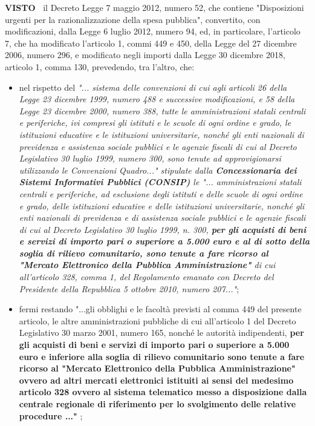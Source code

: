 \textbf{VISTO~}	il Decreto Legge 7 maggio 2012, numero 52, che contiene
"Disposizioni urgenti per la razionalizzazione della spesa pubblica",
convertito, con modificazioni, dalla Legge 6 luglio 2012, numero 94, ed,
in particolare, l'articolo 7, che ha modificato l'articolo 1, commi
449 e 450, della Legge del 27 dicembre 2006, numero 296, e modificato
negli importi dalla Legge 30 dicembre 2018, articolo 1, comma 130,
prevedendo, tra l'altro, che:

\begin{itemize}
    
\item nel rispetto del \textit{"... sistema delle convenzioni di cui
agli articoli 26 della Legge 23 dicembre 1999, numero 488 e successive
modificazioni, e 58 della Legge 23 dicembre 2000, numero 388, tutte
le amministrazioni statali centrali e periferiche, ivi compresi gli
istituti e le scuole di ogni ordine e grado, le istituzioni educative e
le istituzioni universitarie, nonché gli enti nazionali di previdenza
e assistenza sociale pubblici e le agenzie fiscali di cui al Decreto
Legislativo 30 luglio 1999, numero 300, sono tenute ad approvigionarsi
utilizzando le Convenzioni Quadro..." stipulate dalla \textbf{Concessionaria
dei Sistemi Informativi Pubblici (CONSIP)} le "... amministrazioni
statali centrali e periferiche, ad esclusione degli istituti e delle
scuole di ogni ordine e grado, delle istituzioni educative e delle
istituzioni universitarie, nonché gli enti nazionali di previdenza e
di assistenza sociale pubblici e le agenzie fiscali di cui al Decreto
Legislativo 30 luglio 1999, n. 300, \textbf{per gli acquisti di beni e servizi
di importo pari o superiore a 5.000 euro e al di sotto della soglia di
rilievo comunitario, sono tenute a fare ricorso al "Mercato Elettronico
della Pubblica Amministrazione"} di cui all'articolo 328, comma 1,
del Regolamento emanato con Decreto del Presidente della Repubblica 5
ottobre 2010, numero 207..."};

\item fermi restando "...gli obblighi e le facoltà previsti al
comma 449 del presente articolo, le altre amministrazioni pubbliche di
cui all'articolo 1 del Decreto Legislativo 30 marzo 2001, numero 165,
nonché le autorità indipendenti, \textbf{per gli acquisti di beni e servizi di
importo pari o superiore a 5.000 euro e inferiore alla soglia di rilievo
comunitario sono tenute a fare ricorso al "Mercato Elettronico della
Pubblica Amministrazione" ovvero ad altri mercati elettronici istituiti
ai sensi del medesimo articolo 328 ovvero al sistema telematico messo a
disposizione dalla centrale regionale di riferimento per lo svolgimento
delle relative procedure ..."} ;

\end{itemize}


